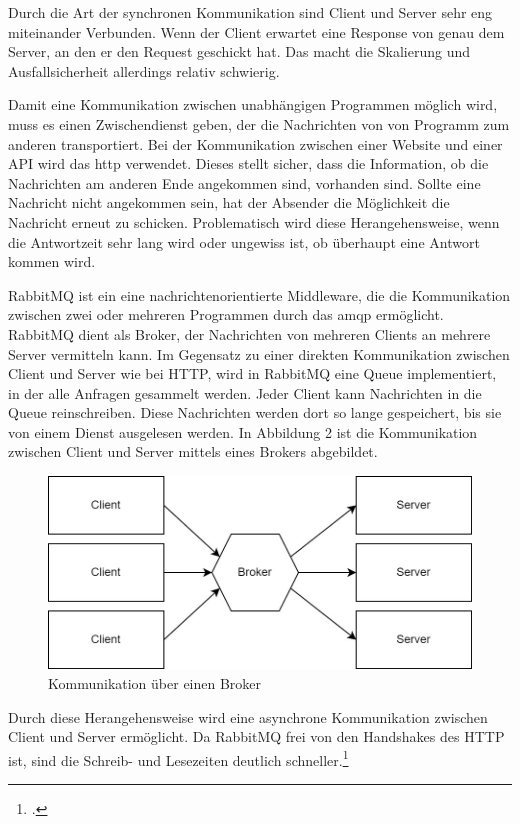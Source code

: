 Durch die Art der synchronen Kommunikation sind Client und Server sehr eng miteinander Verbunden. Wenn der Client erwartet eine Response von genau dem Server, an den er den Request geschickt hat. Das macht die Skalierung und Ausfallsicherheit allerdings relativ schwierig.

Damit eine Kommunikation zwischen unabhängigen Programmen möglich wird, muss es einen Zwischendienst geben, der die Nachrichten von von Programm zum anderen transportiert. Bei der Kommunikation zwischen einer Website und einer API wird das \ac{http} verwendet. Dieses stellt sicher, dass die Information, ob die Nachrichten am anderen Ende angekommen sind, vorhanden sind. Sollte eine Nachricht nicht angekommen sein, hat der Absender die Möglichkeit die Nachricht erneut zu schicken. Problematisch wird diese Herangehensweise, wenn die Antwortzeit sehr lang wird oder ungewiss ist, ob überhaupt eine Antwort kommen wird. 

RabbitMQ ist ein eine nachrichtenorientierte Middleware, die die Kommunikation zwischen zwei oder mehreren Programmen durch das \ac{amqp} ermöglicht. RabbitMQ dient als Broker, der Nachrichten von mehreren Clients an mehrere Server vermitteln kann. Im Gegensatz zu einer direkten Kommunikation zwischen Client und Server wie bei HTTP, wird in RabbitMQ eine Queue implementiert, in der alle Anfragen gesammelt werden. Jeder Client kann Nachrichten in die Queue reinschreiben. Diese Nachrichten werden dort so lange gespeichert, bis sie von einem Dienst ausgelesen werden. In Abbildung 2 ist die Kommunikation zwischen Client und Server mittels eines Brokers abgebildet.
 
\begin{figure}[H]
  \centering
    \includegraphics[width = 15cm]{bilder/Rabbit2}
    \caption{Kommunikation über einen Broker}
\end{figure}

Durch diese Herangehensweise wird eine asynchrone Kommunikation zwischen Client und Server ermöglicht. Da RabbitMQ frei von den Handshakes des HTTP ist, sind die Schreib- und Lesezeiten deutlich schneller.\footcite{ionescu2015analysis}

